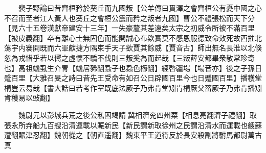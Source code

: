 　　裴子野論曰昔齊桓矜於葵丘而九國叛【公羊傳曰貫澤之會齊桓公有憂中國之心不召而至者江人黃人也葵丘之會桓公震而矜之叛者九國】曹公不禮張松而天下分【見六十五卷漢獻帝建安十三年】一失豪釐其差遠矣太宗之初威令所被不滿百里【被皮義翻】卒有離心士無固色而能開誠心布欵實莫不感恩服德致命效死故西摧北蕩宇内褰開既而六軍獻捷方隅束手天子欲賈其餘威【賈音古】師出無名長淮以北倏忽為戎惜乎若以嚮之虛懷不驕不伐則三叛奚為而起哉【三叛薛安都畢衆敬常珍奇也】高祖蟣虱生介冑【蟣居豨翻蝨子也蝨色櫛翻】經啓疆場【場音亦】後之子孫日蹙百里【大雅召旻之詩曰昔先王受命有如召公日辟國百里今也日蹙國百里】播穫堂構豈云易哉【書大誥曰若考作室既底法厥子乃弗肯堂矧肯構厥父菑厥子乃弗肯播矧肯穫易以䜴翻】

　　魏尉元以彭城兵荒之後公私困竭請冀相濟兖四州粟【相息亮翻濟子禮翻】取張永所弃船九百艘沿清運載以賑新民【新民謂新取徐州之民謂沿清水而運載也艘蘇遭翻賑津忍翻】魏朝從之【朝直遥翻】魏東平王道符反於長安殺副將駙馬都尉萬古真

